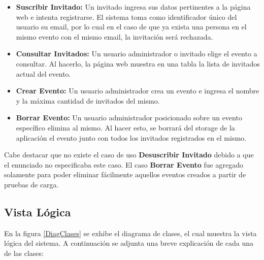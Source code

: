 \documentclass[a4paper,10pt]{article}
\begin{document}
        \begin{itemize}
            \item \textbf{Suscribir Invitado:} Un invitado ingresa sus datos pertinentes a la página web e intenta
            registrarse. El sistema toma como identificador único del usuario su email, por lo cual en el caso de
            que ya exista una persona en el mismo evento con el mismo email, la invitación será rechazada.
            \item \textbf{Consultar Invitados:} Un usuario administrador o invitado elige el evento a consultar. Al 
            hacerlo, la página web muestra en una tabla la lista de invitados actual del evento.  
            \item \textbf{Crear Evento:} Un usuario administrador crea un evento e ingresa el nombre y la 
            máxima cantidad de invitados del mismo.  
            \item \textbf{Borrar Evento:} Un usuario administrador posicionado sobre un evento específico elimina 
            al mismo. Al hacer esto, se borrará del storage de la aplicación el evento junto con todos los invitados
            registrados en el mismo.
            \end{itemize}

        Cabe destacar que no existe el caso de uso \textbf{Desuscribir Invitado} debido a que el enunciado no 
        especificaba este caso. El caso \textbf{Borrar Evento} fue agregado solamente para poder eliminar fácilmente
        aquellos eventos creados a partir de pruebas de carga.


    \newpage
    \subsection{Vista Lógica}
        En la figura \ref{DiagClases} se exhibe el diagrama de clases, el cual muestra la vista lógica del sistema. 
        A continuación se adjunta una breve explicación de cada una de las clases:
\end{document}
